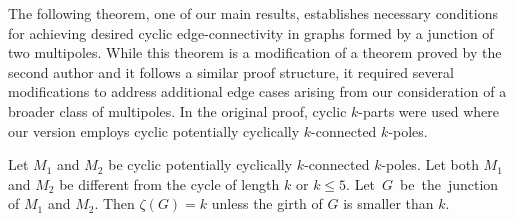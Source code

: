 \documentclass[12pt, twoside]{book}
\begin{document}
The following theorem, one of our main results, establishes necessary conditions for achieving desired cyclic edge-connectivity in graphs formed by a junction of two multipoles. While this theorem is a modification of a theorem proved by the second author \cite{Rajnik_phd} and it follows a similar proof structure, it required several modifications to address additional edge cases arising from our consideration of a broader class of multipoles. In the original proof, cyclic $k$-parts were used where our version employs cyclic potentially cyclically $k$-connected $k$-poles.

\begin{theorem}\label{th:junction-of-kpoles-cyclic-edge-connectivity}
	Let $M_1$ and $M_2$ be cyclic potentially cyclically $k$-connected $k$-poles. Let both $M_1$ and $M_2$ be different from the cycle of length $k$ or $k\leq 5$. \mbox{Let $G$ be the junction} of $M_1$ and $M_2$. Then $\zeta(G)=k$ unless the girth of $G$ is smaller than $k$.
\end{theorem}
\end{document}
